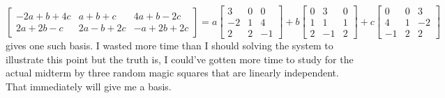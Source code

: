 \documentclass{article}
\begin{document}
\begin{enumerate}[label=(\alph*)]
\begin{equation}
\begin{bmatrix}
            -2a+b+4c & a+b+c & 4a+b-2c \\ 
            2a+2b-c & 2a-b+2c & -a+2b+2c
        \end{bmatrix} = a\begin{bmatrix}
            3 & 0 & 0 \\ 
            -2 & 1 & 4 \\ 
            2 & 2 & -1
        \end{bmatrix} + b\begin{bmatrix}
            0 & 3 & 0 \\ 
            1 & 1 & 1 \\ 
            2 & -1 & 2
        \end{bmatrix} + c\begin{bmatrix}
            0 & 0 & 3 \\ 
            4 & 1 & -2 \\ 
            -1 & 2 & 2
        \end{bmatrix}
    \end{equation}
    gives one such basis. I wasted more time than I should solving the system to illustrate this point but the truth is, I could've gotten more time to study for the actual midterm by three random magic squares that are linearly independent. That immediately will give me a basis.
\end{enumerate}
\end{document}
